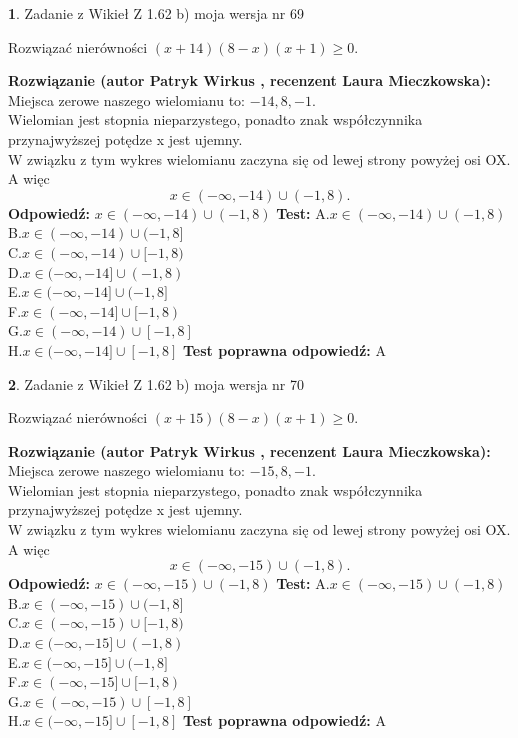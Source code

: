 \documentclass[12pt, a4paper]{article}
\theoremstyle{definition} %
\newtheorem{zad}{}
\newcommand{\zadStart}[1]{\begin{zad}#1\newline}
\newcommand{\zadStop}{\end{zad}}
\newcommand{\rozwStart}[2]{\noindent \textbf{Rozwiązanie (autor #1 , recenzent #2): }\newline}
\newcommand{\rozwStop}{\newline}
\newcommand{\odpStart}{\noindent \textbf{Odpowiedź:}\newline}
\newcommand{\odpStop}{\newline}
\newcommand{\testStart}{\noindent \textbf{Test:}\newline}
\newcommand{\testStop}{\newline}
\newcommand{\kluczStart}{\noindent \textbf{Test poprawna odpowiedź:}\newline}
\newcommand{\kluczStop}{\newline}
\begin{document}
\zadStart{Zadanie z Wikieł Z 1.62 b) moja wersja nr 69}

Rozwiązać nierówności $(x+14)(8-x)(x+1)\ge0$.
\zadStop
\rozwStart{Patryk Wirkus}{Laura Mieczkowska}
Miejsca zerowe naszego wielomianu to: $-14, 8, -1$.\\
Wielomian jest stopnia nieparzystego, ponadto znak współczynnika przy\linebreak najwyższej potędze x jest ujemny.\\ W związku z tym wykres wielomianu zaczyna się od lewej strony powyżej osi OX. A więc $$x \in (-\infty,-14) \cup (-1,8).$$
\rozwStop
\odpStart
$x \in (-\infty,-14) \cup (-1,8)$
\odpStop
\testStart
A.$x \in (-\infty,-14) \cup (-1,8)$\\
B.$x \in (-\infty,-14) \cup (-1,8]$\\
C.$x \in (-\infty,-14) \cup [-1,8)$\\
D.$x \in (-\infty,-14] \cup (-1,8)$\\
E.$x \in (-\infty,-14] \cup (-1,8]$\\
F.$x \in (-\infty,-14] \cup [-1,8)$\\
G.$x \in (-\infty,-14) \cup [-1,8]$\\
H.$x \in (-\infty,-14] \cup [-1,8]$
\testStop
\kluczStart
A
\kluczStop



\zadStart{Zadanie z Wikieł Z 1.62 b) moja wersja nr 70}

Rozwiązać nierówności $(x+15)(8-x)(x+1)\ge0$.
\zadStop
\rozwStart{Patryk Wirkus}{Laura Mieczkowska}
Miejsca zerowe naszego wielomianu to: $-15, 8, -1$.\\
Wielomian jest stopnia nieparzystego, ponadto znak współczynnika przy\linebreak najwyższej potędze x jest ujemny.\\ W związku z tym wykres wielomianu zaczyna się od lewej strony powyżej osi OX. A więc $$x \in (-\infty,-15) \cup (-1,8).$$
\rozwStop
\odpStart
$x \in (-\infty,-15) \cup (-1,8)$
\odpStop
\testStart
A.$x \in (-\infty,-15) \cup (-1,8)$\\
B.$x \in (-\infty,-15) \cup (-1,8]$\\
C.$x \in (-\infty,-15) \cup [-1,8)$\\
D.$x \in (-\infty,-15] \cup (-1,8)$\\
E.$x \in (-\infty,-15] \cup (-1,8]$\\
F.$x \in (-\infty,-15] \cup [-1,8)$\\
G.$x \in (-\infty,-15) \cup [-1,8]$\\
H.$x \in (-\infty,-15] \cup [-1,8]$
\testStop
\kluczStart
A
\kluczStop
\end{document}
